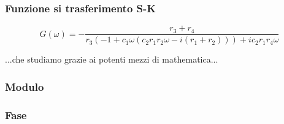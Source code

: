 			\begin{frame}[c]\frametitle{Funzione si trasferimento S-K}

			\begin{equation}
			    \label{eq:s-k}
					G\left(\omega\right)= -\frac{r_3+r_4}{r_3 (-1+c_1 \omega  (c_2 r_1 r_2 \omega -i (r_1+r_2)))+i c_2 r_1 r_4 \omega }
			\end{equation}
			    \pause
			    \begin{center}
			    	...che studiamo grazie ai potenti mezzi di mathematica...
			    \end{center}
			\end{frame}

			\begin{frame}[c]\frametitle{Modulo}
				
					    
					
			\end{frame}

			\begin{frame}[c]\frametitle{Fase}

	 			
			
			\end{frame}



